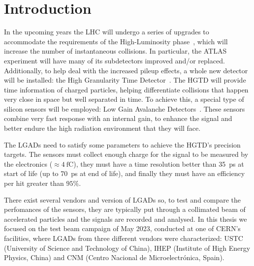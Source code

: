 
\chapter*{Introduction}\label{chap:intro}

In the upcoming years the LHC will undergo a series of upgrades to accommodate the requirements of the High-Luminosity phase~\cite{cernHLLHCProject}, which will increase the number of instantaneous collisions. In particular, the ATLAS experiment will have many of its subdetectors improved and/or replaced. Additionally, to help deal with the increased pileup effects, a whole new detector will be installed: the High Granularity Time Detector~\cite{cernTechnicalDesign}. The HGTD will provide time information of charged particles, helping differentiate collisions that happen very close in space but well separated in time. To achieve this, a special type of silicon sensors will be employed: Low Gain Avalanche Detectors~\cite{PELLEGRINI201412}. These sensors combine very fast response with an internal gain, to enhance the signal and better endure the high radiation environment that they will face.

The LGADs need to satisfy some parameters to achieve the HGTD's precision targets. The sensors must collect enough charge for the signal to be measured by the electronics (\(\approx \qty{4}{\femto\coulomb} \)), they must have a time resolution better than \qty{35}{\pico\second} at start of life (up to \qty{70}{\pico\second} at end of life), and finally they must have an efficiency per hit greater than \(95\%\). 

There exist several vendors and version of LGADs so, to test and compare the perfomances of the sensors, they are typically put through a collimated beam of accelerated particles and the signals are recorded and analysed. In this thesis we focused on the test beam campaign of May 2023, conducted at one of CERN's facilities, where LGADs from three different vendors were characterized: USTC (University of Science and Technology of China), IHEP (Institute of High Energy Physics, China) and CNM (Centro Nacional de Microelectr\'onica, Spain).  






